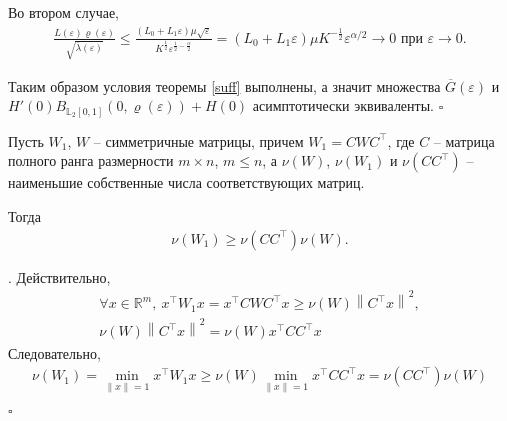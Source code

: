 \documentclass[../main.tex]{subfiles}
\begin{document}
    Во втором случае,
    \begin{gather*}
        \frac{L(\varepsilon) \varrho(\varepsilon)}{\sqrt{\overline{\lambda}(\varepsilon)}} 
        \leqslant
        \frac{(L_0+L_1\varepsilon)\mu\sqrt{\varepsilon}}{{K^{\frac{1}{2}}}\varepsilon^{\frac{1}{2}-\frac{\alpha}{2}}}
        =
        (L_0+L_1\varepsilon)\mu K^{-\frac{1}{2}}\varepsilon^{\alpha/2} \rightarrow 0 \mbox{\ при\ } \varepsilon \rightarrow 0.
    \end{gather*}
    
    Таким образом условия теоремы \ref{suff} выполнены, а значит множества $ \overline{G}(\varepsilon) $ и \\$ H'(0)B_{\mathbb{L}_2[0,1]}(0,\varrho(\varepsilon))+ H(0) $ асимптотически эквиваленты.
    \hfill $\square$
    \begin{utv}
        Пусть $ W_1 $, $ W $ -- симметричные матрицы, причем $ W_1 = C W C^{\top} $, где $ C $ -- матрица  полного ранга размерности $ m \times n $, $ m \leqslant n $, а $ \nu(W) $, $ \nu(W_1) $ и $ \nu(CC^{\top}) $ -- наименьшие собственные числа соответствующих матриц.
        
        Тогда
        \begin{gather*}
            \nu(W_1) \geqslant \nu(CC^{\top})  \nu(W).
        \end{gather*}
    \end{utv}
    \doc. 
    Действительно,
    \begin{gather*}
        \forall x \in \mathbb{R}^m, \: x^{\top} W_1 x = x^{\top} C W C^{\top} x \geqslant \nu(W)\left\| C^{\top}x \right\| ^2,\\
        \nu(W)\left\| C^{\top}x \right\| ^2 = \nu(W) x^{\top} C C^{\top} x
    \end{gather*}
    Следовательно,
    \begin{gather*}
        \nu(W_1) = \min \limits_{\left\| x\right\| =1}x^{\top}W_1x \geqslant \nu(W)\min \limits_{\left\| x\right\| =1}x^{\top}CC^{\top}x = \nu(CC^{\top})  \nu(W) 
    \end{gather*} \begin{flushright}
        \hfill $ \square $
    \end{flushright}
    
\end{document}
